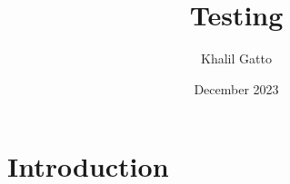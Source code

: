 \documentclass{article}
\title{Testing}
\author{Khalil Gatto}
\date{December 2023}
\begin{document}
\maketitle

\section{Introduction}
\end{document}
